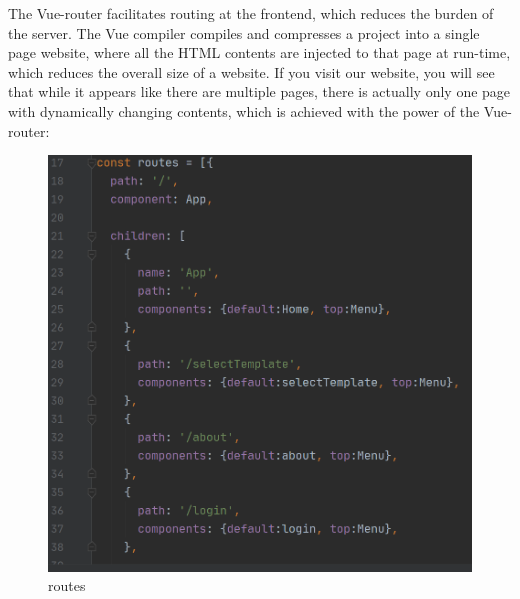 \documentclass[11pt]{article}
\begin{document}
\begin{spacing}{1.0}
\begin{itemize}
	\hspace{\parindent}The Vue-router facilitates routing at the frontend, which reduces the burden of the server.
The Vue compiler compiles and compresses a project into a single page website, where all the HTML contents are injected to that page at run-time, which reduces the overall size of a website. 
	If you visit our website, you will see that while it appears like there are multiple pages, there is actually only one page with dynamically changing contents, which is achieved with the power of the Vue-router:
	\begin{figure}[H]
	\centering
	\includegraphics[scale=.3]{figures/routes.png}
	\caption{routes}
	\label{fig:8}
\end{figure}
	

\end{itemize}
\end{spacing}
\end{document}

